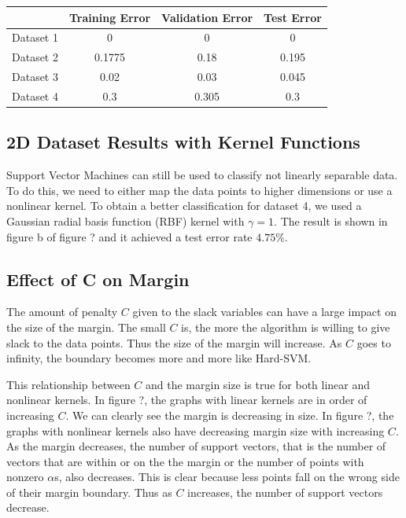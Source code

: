 \documentclass[10pt,twoside]{article}
\begin{document}
\begin{center}
 \begin{tabular}{||c c c c||} 
 \hline
  & Training Error & Validation Error & Test Error \\ [0.5ex] 
 \hline\hline
 Dataset 1 & 0 & 0 & 0 \\ 
 \hline
 Dataset 2 & 0.1775 & 0.18 & 0.195 \\
 \hline
 Dataset 3 & 0.02 & 0.03 & 0.045 \\
 \hline
 Dataset 4 & 0.3 & 0.305 & 0.3 \\
 \hline
\end{tabular}
\end{center}

\subsection{2D Dataset Results with Kernel Functions}

Support Vector Machines can still be used to classify not linearly separable data. To do this, we need to either map the data points to higher dimensions or use a nonlinear kernel. To obtain a better classification for dataset 4, we used a Gaussian radial basis function (RBF) kernel with $\gamma = 1$. The result is shown in figure b of figure ? and it achieved a test error rate $4.75\%$.


\subsection{Effect of C on Margin}
The amount of penalty $C$ given to the slack variables can have a large impact on the size of the margin. The small $C$ is, the more the algorithm is willing to give slack to the data points. Thus the size of the margin will increase. As $C$ goes to infinity, the boundary becomes more and more like Hard-SVM. 

This relationship between $C$ and the margin size is true for both linear and nonlinear kernels. In figure ?, the graphs with linear kernels are in order of increasing $C$. We can clearly see the margin is decreasing in size. In figure ?, the graphs with nonlinear kernels also have decreasing margin size with increasing $C$. As the margin decreases, the number of support vectors, that is the number of vectors that are within or on the the margin or the number of points with nonzero $\alpha$s, also decreases. This is clear because less points fall on the wrong side of their margin boundary. Thus as $C$ increases, the number of support vectors decrease. 
\end{document}
